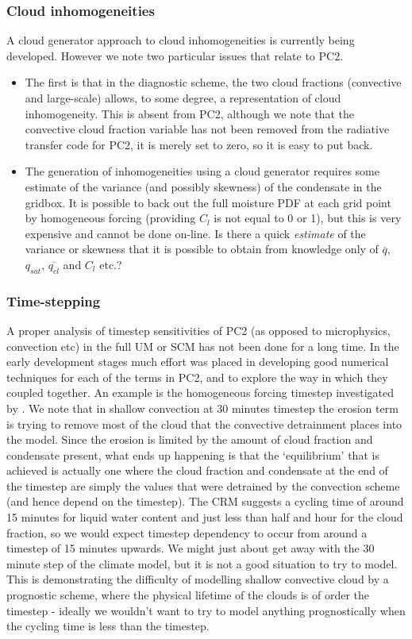 \documentclass{UMDP_article}
\begin{document}
\subsubsection{Cloud inhomogeneities}
A cloud generator approach to cloud inhomogeneities is currently
being developed. However we note two particular issues that relate
to PC2.
\begin{itemize}
\item{The first is that in the diagnostic scheme, the two cloud
fractions (convective and large-scale) allows, to some degree, a
representation of cloud inhomogeneity. This is absent from PC2,
although we note that the convective cloud fraction variable has
not been removed from the radiative transfer code for PC2, it is merely set
to zero, so it is easy to put back.}
\item{The generation of inhomogeneities using a cloud generator
requires some estimate of the variance (and possibly skewness)
of the condensate in the
gridbox. It is possible to back out the full moisture PDF at
each grid point by homogeneous forcing (providing $C_l$ is not equal
to 0 or 1), but this is very expensive and cannot be done on-line. Is
there a quick \textit{estimate} of the variance or skewness that it is
possible to obtain from knowledge only of $\overline{q}$,
$q_{sat}$, $\overline{q_{cl}}$ and $C_l$ etc.?}
\end{itemize}

\subsubsection{Time-stepping}
\label{sec:timestepping}
A proper analysis of timestep sensitivities of PC2 (as opposed to
microphysics, convection etc) in the full UM
or SCM has not been done for a long time.
In the early development stages much effort was
placed in developing good numerical techniques for each of the terms
in PC2, and to explore the way in which they coupled together. An example
is the homogeneous forcing timestep investigated by \cite{wg03}.
We note that in shallow convection at 30 minutes timestep the erosion
term is trying to remove
most of the cloud that the convective detrainment places into the model.
Since the erosion is limited by the amount of cloud fraction and
condensate present, what ends
up happening is that the `equilibrium' that is achieved is actually one where
the cloud fraction and condensate at the end of the timestep are simply
the values that were detrained by the convection scheme (and hence depend
on the timestep). The CRM suggests a cycling time of around 15 minutes for
liquid water content and just less than half and hour for the cloud fraction,
so we would expect timestep dependency to occur from around a timestep of
15 minutes upwards. We might just about get away with the 30 minute step
of the climate model, but it is not a good situation to try to model. 
This is demonstrating the difficulty of modelling shallow convective cloud
by a prognostic scheme, where the physical lifetime of the clouds is
of order the timestep - ideally we wouldn't want to try to model anything
prognostically when the cycling time is less than the timestep.
\end{document}
